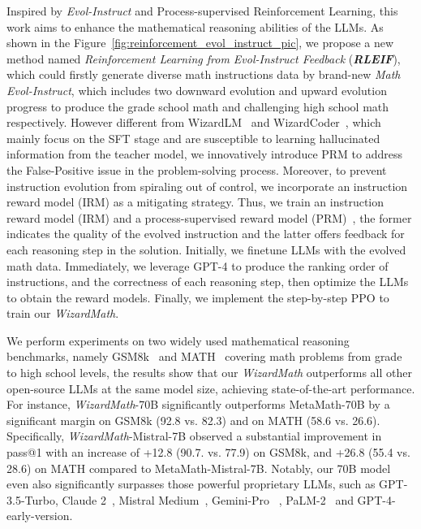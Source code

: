 Inspired by \emph{Evol-Instruct} and Process-supervised Reinforcement Learning, this work aims to enhance the  mathematical reasoning abilities of the LLMs. As shown in the Figure~\ref{fig:reinforcement_evol_instruct_pic}, we propose a new method named \emph{Reinforcement Learning from Evol-Instruct Feedback} (\textbf{\emph{RLEIF}}), which could firstly generate diverse math instructions data by brand-new \emph{Math Evol-Instruct}, which includes two downward  evolution and upward evolution progress to produce the grade school math and  challenging high school math respectively. However different from WizardLM~\citep{xu2023wizardlm} and WizardCoder~\citep{luo2023wizardcoder}, which mainly focus on the SFT stage and are susceptible to learning hallucinated information from the teacher model, we innovatively introduce PRM to address the False-Positive issue in the problem-solving process. Moreover, to prevent instruction evolution from spiraling out of control, we incorporate an instruction reward model (IRM) as a mitigating strategy.  Thus, we train an instruction  reward model (IRM) and a process-supervised reward model (PRM)~\citep{lightman2023openai-verify-step-by-step,uesato2022deepmind-orms, wang2024-mathshepherd, chen2024-autoprm}, the former indicates the quality of the evolved instruction and the latter offers feedback for each reasoning step in the  solution. Initially, we finetune LLMs with the evolved math data. Immediately, we leverage GPT-4 to produce the ranking order of instructions, and the correctness of each reasoning step, then optimize the LLMs to obtain the reward models. Finally, we implement the step-by-step PPO to train our \emph{WizardMath}.

We perform experiments on two widely used mathematical reasoning benchmarks, namely GSM8k~\citep{cobbe2021training_gsm8k_2} and MATH~\citep{hendrycks2021measuring} covering math problems from grade to high school levels, the results show that our \emph{WizardMath} outperforms all other open-source LLMs at the same model size, achieving state-of-the-art performance. For instance, \emph{WizardMath}-70B significantly outperforms MetaMath-70B by a significant margin on GSM8k (92.8 vs. 82.3) and on MATH (58.6 vs. 26.6). Specifically, \emph{WizardMath}-Mistral-7B observed a substantial improvement in pass@1 with an increase of +12.8 (90.7. vs. 77.9) on GSM8k, and +26.8 (55.4 vs. 28.6) on MATH compared to MetaMath-Mistral-7B. Notably, our 70B model even also significantly surpasses those powerful proprietary LLMs, such as GPT-3.5-Turbo,  Claude 2~\citep{bai2022constitutional-claude}, Mistral Medium~\citep{jiang2024mixtral}, Gemini-Pro ~\citep{geminiteam2023gemini}, PaLM-2~\citep{palm2} and GPT-4-early-version.

